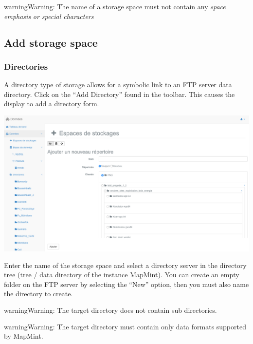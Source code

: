 \documentclass[letterpaper,10pt,english]{sphinxmanual}
\begin{document}
\begin{notice}{warning}{Warning:}
The name of a storage space must not contain any  \emph{space} \emph{emphasis}  \emph{or special characters}
\end{notice}


\subsection{Add storage space}
\label{data/datastores:ajouter-un-espace-de-stockage}\label{data/datastores:datadatastores-add}

\subsubsection{Directories}
\label{data/datastores:repertoires}
A directory type of storage allows for a symbolic link to an FTP server data directory. Click on the ``Add Directory'' found in the toolbar. This causes the display to add a directory form.

\includegraphics[width=1.000\linewidth]{add-directory-window.png}

Enter the name of the storage space and select a directory server in the directory tree (tree / data directory of the instance MapMint). You can create an empty folder on the FTP server by selecting the ``New'' option, then you must also name the directory to create.

\begin{notice}{warning}{Warning:}
The target directory does not contain sub directories.
\end{notice}

\begin{notice}{warning}{Warning:}
The target directory must contain only data formats supported by MapMint.
\end{notice}
\end{document}
